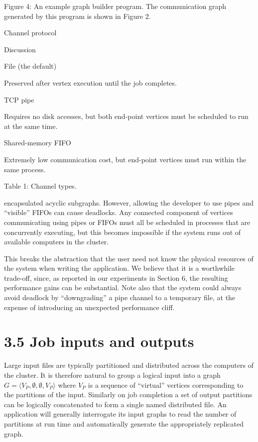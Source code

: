 \documentclass[
]{article}
\begin{document}
Figure 4: An example graph builder program. The communication graph
generated by this program is shown in Figure 2.

Channel protocol

Discussion

File (the default)

Preserved after vertex execution until the job completes.

TCP pipe

Requires no disk accesses, but both end-point vertices must be scheduled
to run at the same time.

Shared-memory FIFO

Extremely low communication cost, but end-point vertices must run within
the same process.

Table 1: Channel types.

encapsulated acyclic subgraphs. However, allowing the developer to use
pipes and ``visible'' FIFOs can cause deadlocks. Any connected component
of vertices communicating using pipes or FIFOs must all be scheduled in
processes that are concurrently executing, but this becomes impossible
if the system runs out of available computers in the cluster.

This breaks the abstraction that the user need not know the physical
resources of the system when writing the application. We believe that it
is a worthwhile trade-off, since, as reported in our experiments in
Section 6, the resulting performance gains can be substantial. Note also
that the system could always avoid deadlock by ``downgrading'' a pipe
channel to a temporary file, at the expense of introducing an unexpected
performance cliff.

\section{3.5 Job inputs and outputs}\label{job-inputs-and-outputs}

Large input files are typically partitioned and distributed across the
computers of the cluster. It is therefore natural to group a logical
input into a graph
\(G = \langle V_{P}, \emptyset, \emptyset, V_{P} \rangle\) where
\(V_{P}\) is a sequence of ``virtual'' vertices corresponding to the
partitions of the input. Similarly on job completion a set of output
partitions can be logically concatenated to form a single named
distributed file. An application will generally interrogate its input
graphs to read the number of partitions at run time and automatically
generate the appropriately replicated graph.
\end{document}

